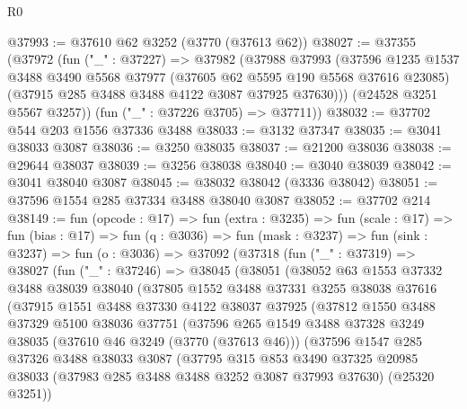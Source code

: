 \begin{lexlean}{R0}
\begin{coremodule}
@37993 := @37610 @62 @3252 (@3770 (@37613 @62))
@38027 := @37355
    (@37972
      (fun ("_" : @37227) =>
      @37982
        (@37988
          @37993
          (@37596
            @1235
            @1537
            @3488
            @3490
            @5568
            @37977
            (@37605 @62 @5595 @190 @5568 @37616 @23085)
            (@37915 @285 @3488 @3488 @4122 @3087 @37925 @37630)))
        (@24528 @3251 @5567 @3257))
      (fun ("_" : @37226 @3705) => @37711))
@38032 := @37702 @544 @203 @1556 @37336 @3488
@38033 := @3132 @37347
@38035 := @3041 @38033 @3087
@38036 := @3250 @38035
@38037 := @21200 @38036
@38038 := @29644 @38037
@38039 := @3256 @38038
@38040 := @3040 @38039
@38042 := @3041 @38040 @3087
@38045 := @38032 @38042 (@3336 @38042)
@38051 := @37596 @1554 @285 @37334 @3488 @38040 @3087
@38052 := @37702 @214
@38149 := fun (opcode : @17) =>
  fun (extra : @3235) =>
  fun (scale : @17) =>
  fun (bias : @17) =>
  fun (q : @3036) =>
  fun (mask : @3237) =>
  fun (sink : @3237) =>
  fun (o : @3036) =>
  @37092
    (@37318
      (fun ("_" : @37319) =>
      @38027
        (fun ("_" : @37246) =>
        @38045
          (@38051
            (@38052
              @63
              @1553
              @37332
              @3488
              @38039
              @38040
              (@37805
                @1552
                @3488
                @37331
                @3255
                @38038
                @37616
                (@37915
                  @1551
                  @3488
                  @37330
                  @4122
                  @38037
                  @37925
                  (@37812
                    @1550
                    @3488
                    @37329
                    @5100
                    @38036
                    @37751
                    (@37596
                      @265
                      @1549
                      @3488
                      @37328
                      @3249
                      @38035
                      (@37610 @46 @3249 (@3770 (@37613 @46)))
                      (@37596
                        @1547
                        @285
                        @37326
                        @3488
                        @38033
                        @3087
                        (@37795
                          @315
                          @853
                          @3490
                          @37325
                          @20985
                          @38033
                          (@37983 @285 @3488 @3488 @3252 @3087 @37993 @37630)
                          (@25320 @3251))

\end{coremodule}
\end{lexlean}
